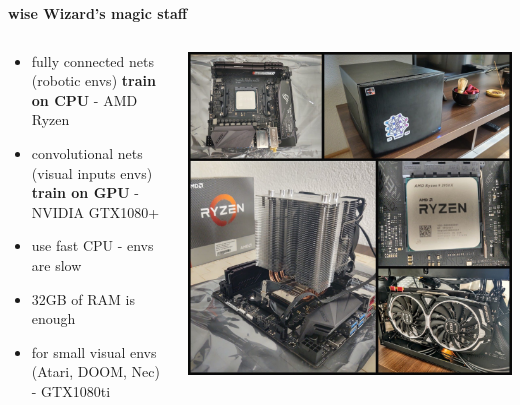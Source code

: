 \documentclass[xcolor=dvipsnames]{beamer}
\begin{document}
\begin{frame}{\bf wise Wizard's magic staff}

  \begin{columns}

    \begin{column}{0.5\textwidth}
      \begin{itemize}
        \item fully connected nets (robotic envs) {\bf \color{red} train on CPU} - AMD Ryzen
        \item convolutional nets (visual inputs envs) {\bf \color{red} train on GPU} - NVIDIA GTX1080+
        \item use fast CPU - envs are slow
        \item 32GB of RAM is enough
        \item for small visual envs (Atari, DOOM, Nec) - GTX1080ti
      \end{itemize}
    \end{column}

    \begin{column}{0.5\textwidth}
      {\centering \includegraphics[scale=0.1]{../images/computer.jpg}}
    \end{column}

  \end{columns}


\end{frame}
\end{document}
